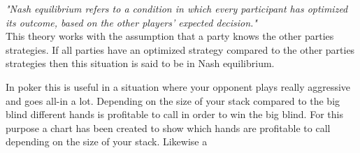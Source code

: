 \textit{"Nash equilibrium refers to a condition in which every participant has optimized its outcome, based on the other players’ expected decision."}\\

This theory works with the assumption that a party knows the other parties strategies. If all parties have an optimized strategy compared to the other parties strategies then this situation is said to be in Nash equilibrium.

In poker this is useful in a situation where your opponent plays really aggressive and goes all-in a lot. Depending on the size of your stack compared to the big blind different hands is profitable to call in order to win the big blind. For this purpose a chart has been created to show which hands are profitable to call depending on the size of your stack. Likewise a 